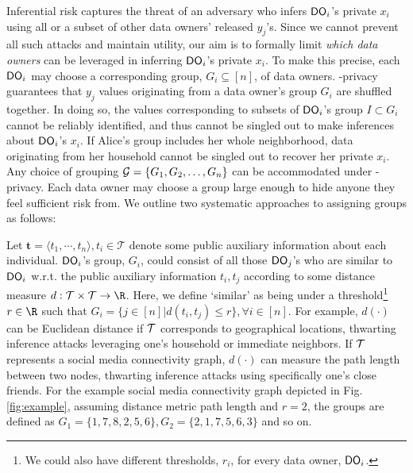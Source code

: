 Inferential risk captures the threat of an adversary who infers $\textsf{DO}_i$'s private $x_i$ using all or a subset of other data owners' released $y_j$'s. Since we cannot prevent all such attacks and maintain utility, our aim is to formally limit \emph{which data owners} can be leveraged in inferring $\textsf{DO}_i$'s private $x_i$. To make this precise, each $\textsf{DO}_i$ may choose a corresponding group, $G_i \subseteq [n]$, of data owners.
 \name-privacy guarantees that $y_j$ values originating from a data owner's group $G_i$ are shuffled together. In doing so, the \ldp values corresponding to subsets of $\textsf{DO}_i$'s group $I \subset G_i$ cannot be reliably identified, and thus cannot be singled out to make inferences about $\textsf{DO}_i$'s $x_i$. If Alice's group includes her whole neighborhood, \ldp data originating from her household cannot be singled out to recover her private $x_i$. %
\\Any choice of grouping $\mathcal{G} = \{G_1, G_2, \dots, G_n\}$ can be accommodated under \name-privacy. Each data owner may choose a group large enough to hide anyone they feel sufficient risk from.  We outline two systematic approaches to assigning groups as follows: %
   \vspace{-0.1cm}\squishlistfour    \vspace{-0.1cm}
\item Let $\mathbf{t}=\langle t_1, \cdots, t_n \rangle, t_i \in \mathcal{T}$ denote some public auxiliary information about each individual. $\textsf{DO}_i$'s group, $G_i$, could consist of all those $\textsf{DO}_j$'s who are similar to $\textsf{DO}_i$ w.r.t. the public auxiliary information $t_i, t_j$ according to some distance measure $d:\calT \times \calT \rightarrow \R$. Here, we define `similar' as being under a threshold\footnote{We could also have different thresholds, $r_i$, for every data owner, $\textsf{DO}_i$.} $r \in \R$ such that $G_i = \{j \in [n] \big| d(t_i,t_j) \leq r\},     \forall i \in [n]$.
For example, $d(\cdot)$ can be Euclidean distance if $\mathcal{T}$ corresponds to geographical locations, thwarting inference attacks leveraging one's household or immediate neighbors.
If $\mathcal{T}$ represents a social media connectivity graph, $d(\cdot)$ can measure the path length between two nodes, thwarting inference attacks using specifically one's close friends. For the example social media connectivity graph depicted in Fig. \ref{fig:example}, assuming distance metric path length and $r=2$, the groups are defined as  $G_1=\{1,7,8,2,5,6\}, G_2=\{2,1,7,5,6,3\}$ and so on. 

